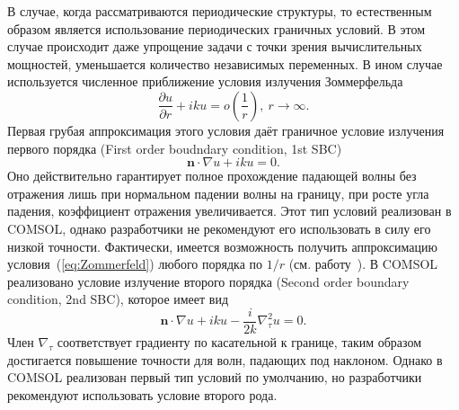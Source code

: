 В случае, когда рассматриваются периодические структуры, то естественным образом является использование периодических граничных условий. В этом случае происходит даже упрощение задачи с точки зрения вычислительных мощностей, уменьшается количество независимых переменных. В ином случае используется численное приближение условия излучения Зоммерфельда~\cite{bayliss1982boundary}
\begin{equation}
    \frac{\partial u}{\partial r}+i k u = o(\frac{1}{r}), \ r\to \infty.
    \label{eq:Zommerfeld}
\end{equation}
Первая грубая аппроксимация этого условия даёт граничное условие излучения первого порядка (First order boudndary condition, 1st SBC)
\begin{equation}
    \textbf{n}\cdot \nabla u+i k u = 0.
    \label{eq:SBC_1}
\end{equation}
Оно действительно гарантирует полное прохождение падающей волны без отражения лишь при нормальном падении волны на границу, при росте угла падения, коэффициент отражения увеличивается. Этот тип условий реализован в COMSOL, однако разработчики не рекомендуют его использовать в силу его низкой точности. Фактически, имеется возможность получить аппроксимацию условия~(\ref{eq:Zommerfeld}) любого порядка по $1/r$ (см. работу~\cite{bayliss1982boundary}). В COMSOL реализовано условие излучение второго порядка (Second order boundary condition, 2nd SBC), которое имеет вид
\begin{equation}
    \textbf{n}\cdot \nabla u+i k u - \frac{i}{2 k} \nabla^2_\tau u= 0.
    \label{eq:SBC_2}
\end{equation}
Член $\nabla_\tau$ соответствует градиенту по касательной к границе, таким образом достигается повышение точности для волн, падающих под наклоном. Однако в COMSOL реализован первый тип условий по умолчанию, но разработчики рекомендуют использовать условие второго рода.

